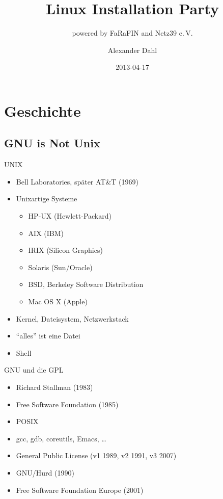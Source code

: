\documentclass{beamer}
\title{Linux Installation Party}
\subtitle{powered by FaRaFIN and Netz39 e.\,V.}
\author{Alexander Dahl}
\institute[alex@netz39.de]{\url{http://www.netz39.de/}}
\date{2013-04-17}
\begin{document}
\begin{frame}
	\titlepage
\end{frame}


\section{Geschichte}

\subsection{GNU is Not Unix}

\begin{frame}{UNIX}
    \begin{itemize}
        \item Bell Laboratories, später AT\&T (1969)
        \item Unixartige Systeme
            \begin{itemize}
                \item HP-UX (Hewlett-Packard)
                \item AIX (IBM)
                \item IRIX (Silicon Graphics)
                \item Solaris (Sun/Oracle)
                \item BSD, Berkeley Software Distribution
                \item Mac OS X (Apple)
            \end{itemize}
        \item Kernel, Dateisystem, Netzwerkstack
        \item \enquote{alles} ist eine Datei
        \item Shell
    \end{itemize}
\end{frame}

\begin{frame}{GNU und die GPL}
    \begin{itemize}
        \item Richard Stallman (1983)
        \item Free Software Foundation (1985)
        \item POSIX
        \item gcc, gdb, coreutils, Emacs, …
        \item General Public License (v1 1989, v2 1991, v3 2007)
        \item GNU/Hurd (1990)
        \item Free Software Foundation Europe (2001)
    \end{itemize}
\end{frame}
\end{document}
